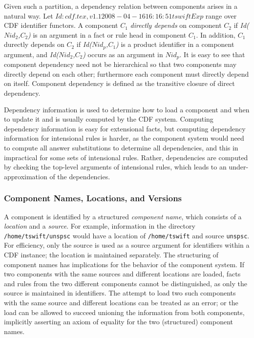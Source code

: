 Given such a partition, a dependency relation between components
arises in a natural way.  Let $Id: cdf.tex,v 1.1 2008-04-16 16:16:51 tswift Exp $ range over CDF identifier functors.
A component $C_1$ {\em directly depends} on component $C_2$ if {\em
Id($Nid_2$,$C_2$)} is an argument in a fact or rule head in component
$C_1$.  In addition, $C_1$ durectly depends on $C_2$ if {\em
Id($Nid_p$,$C_1$)} is a product identifier in a component argument,
and {\em Id($Nid_2$,$C_2$)} occurs as an argument in $Nid_p$.  It is
easy to see that component dependency need not be hierarchical so that
two components may directly depend on each other; furthermore each
component must directly depend on itself.  Component dependency is
defined as the transitive closure of direct dependency.

Dependency information is used to determine how to load a component
and when to update it and is usually computed by the CDF system.
Computing dependency information is easy for extensional facts, but
computing dependency information for intensional rules is harder, as
the component system would need to compute all answer substitutions to
determine all dependencies, and this in impractical for some sets of
intensional rules.  Rather, dependencies are computed by checking the
top-level arguments of intensional rules, which leads to an
under-approximation of the dependencies.

\subsubsection{Component Names, Locations, and Versions}

A component is identified by a structured {\em component name}, which
consists of a {\em location} and a {\em source}.  For example,
information in the directory {\tt /home/tswift/unspsc} would have a
location of {\tt /home/tswift} and source {\tt unspsc}.  For
efficiency, only the source is used as a source argument for
identifiers within a CDF instance; the location is maintained
separately.  The structuring of component names has implications for
the behavior of the component system.  If two components with the same
sources and different locations are loaded, facts and rules from the
two different components cannot be distinguished, as only the source
is maintained in identifiers.  The attempt to load two such components
with the same source and different locations can be treated as an
error; or the load can be allowed to succeed unioning the information
from both components, implicitly asserting an axiom of equality for
the two (structured) component names.

